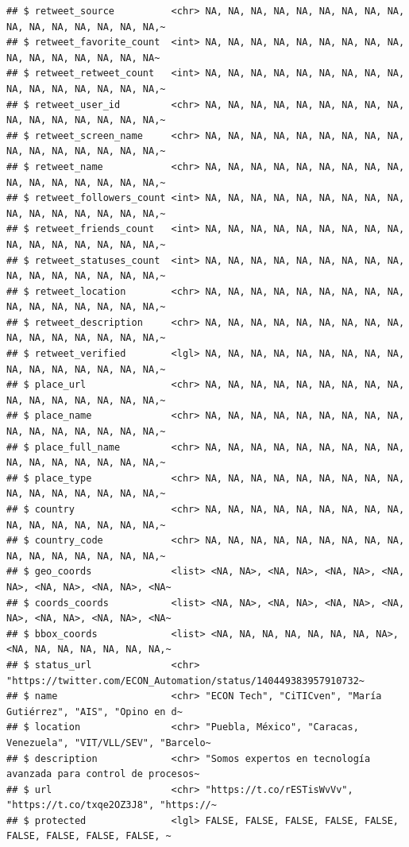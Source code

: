 \documentclass[
]{book}
\begin{document}
\begin{verbatim}
## $ retweet_source          <chr> NA, NA, NA, NA, NA, NA, NA, NA, NA, NA, NA, NA, NA, NA, NA, NA,~
## $ retweet_favorite_count  <int> NA, NA, NA, NA, NA, NA, NA, NA, NA, NA, NA, NA, NA, NA, NA, NA~
## $ retweet_retweet_count   <int> NA, NA, NA, NA, NA, NA, NA, NA, NA, NA, NA, NA, NA, NA, NA, NA,~
## $ retweet_user_id         <chr> NA, NA, NA, NA, NA, NA, NA, NA, NA, NA, NA, NA, NA, NA, NA, NA,~
## $ retweet_screen_name     <chr> NA, NA, NA, NA, NA, NA, NA, NA, NA, NA, NA, NA, NA, NA, NA, NA,~
## $ retweet_name            <chr> NA, NA, NA, NA, NA, NA, NA, NA, NA, NA, NA, NA, NA, NA, NA, NA,~
## $ retweet_followers_count <int> NA, NA, NA, NA, NA, NA, NA, NA, NA, NA, NA, NA, NA, NA, NA, NA,~
## $ retweet_friends_count   <int> NA, NA, NA, NA, NA, NA, NA, NA, NA, NA, NA, NA, NA, NA, NA, NA,~
## $ retweet_statuses_count  <int> NA, NA, NA, NA, NA, NA, NA, NA, NA, NA, NA, NA, NA, NA, NA, NA,~
## $ retweet_location        <chr> NA, NA, NA, NA, NA, NA, NA, NA, NA, NA, NA, NA, NA, NA, NA, NA,~
## $ retweet_description     <chr> NA, NA, NA, NA, NA, NA, NA, NA, NA, NA, NA, NA, NA, NA, NA, NA,~
## $ retweet_verified        <lgl> NA, NA, NA, NA, NA, NA, NA, NA, NA, NA, NA, NA, NA, NA, NA, NA,~
## $ place_url               <chr> NA, NA, NA, NA, NA, NA, NA, NA, NA, NA, NA, NA, NA, NA, NA, NA,~
## $ place_name              <chr> NA, NA, NA, NA, NA, NA, NA, NA, NA, NA, NA, NA, NA, NA, NA, NA,~
## $ place_full_name         <chr> NA, NA, NA, NA, NA, NA, NA, NA, NA, NA, NA, NA, NA, NA, NA, NA,~
## $ place_type              <chr> NA, NA, NA, NA, NA, NA, NA, NA, NA, NA, NA, NA, NA, NA, NA, NA,~
## $ country                 <chr> NA, NA, NA, NA, NA, NA, NA, NA, NA, NA, NA, NA, NA, NA, NA, NA,~
## $ country_code            <chr> NA, NA, NA, NA, NA, NA, NA, NA, NA, NA, NA, NA, NA, NA, NA, NA,~
## $ geo_coords              <list> <NA, NA>, <NA, NA>, <NA, NA>, <NA, NA>, <NA, NA>, <NA, NA>, <NA~
## $ coords_coords           <list> <NA, NA>, <NA, NA>, <NA, NA>, <NA, NA>, <NA, NA>, <NA, NA>, <NA~
## $ bbox_coords             <list> <NA, NA, NA, NA, NA, NA, NA, NA>, <NA, NA, NA, NA, NA, NA, NA,~
## $ status_url              <chr> "https://twitter.com/ECON_Automation/status/140449383957910732~
## $ name                    <chr> "ECON Tech", "CiTICven", "María Gutiérrez", "AIS", "Opino en d~
## $ location                <chr> "Puebla, México", "Caracas, Venezuela", "VIT/VLL/SEV", "Barcelo~
## $ description             <chr> "Somos expertos en tecnología avanzada para control de procesos~
## $ url                     <chr> "https://t.co/rESTisWvVv", "https://t.co/txqe2OZ3J8", "https://~
## $ protected               <lgl> FALSE, FALSE, FALSE, FALSE, FALSE, FALSE, FALSE, FALSE, FALSE, ~

\end{verbatim}
\end{document}
